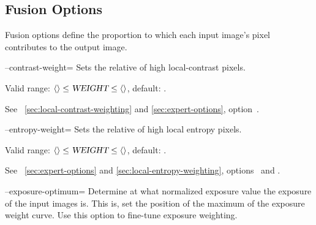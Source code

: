

\subsection[Fusion Options]{\label{sec:fusion-options}%
  Fusion Options}

Fusion options define the proportion to which each input image's pixel contributes to the output
image.

\begin{codelist}
  \label{opt:contrast-weight}%
\item[--contrast-weight=\metavar{WEIGHT}]\itemend
  Sets the relative  of high local-contrast pixels.

  Valid range: $\val{val:minimum-weight-contrast} \leq \metavar{WEIGHT} \leq
  \val{val:maximum-weight-contrast}$, default: .

  See \sectionName~\ref{sec:local-contrast-weighting} and \ref{sec:expert-options},
  option~.


  \label{opt:entropy-weight}%
\item[--entropy-weight=\metavar{WEIGHT}]\itemend
  Sets the relative  of high local entropy pixels.

  Valid range: $\val{val:minimum-weight-entropy} \leq \metavar{WEIGHT} \leq
  \val{val:maximum-weight-entropy}$, default: .

  See \sectionName~\ref{sec:expert-options} and \ref{sec:local-entropy-weighting},
  options~ and .


  \label{opt:exposure-optimum}%
\item[--exposure-optimum=\metavar{OPTIMUM}]\itemend
  Determine at what normalized exposure value the  exposure of the input images
  is.  This is, set the position of the maximum of the exposure weight curve.  Use this option
  to fine-tune exposure weighting.


\end{codelist}

